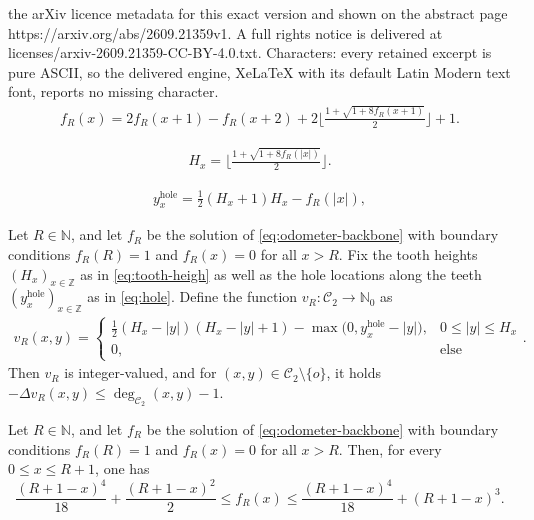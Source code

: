 \documentclass[10pt,a4paper]{amsart}
\newcommand{\N}{\mathbb{N}}
\newcommand{\Z}{\mathbb{Z}}
\begin{document}
the arXiv licence metadata for this exact version and shown on the abstract page https://arxiv.org/abs/2609.21359v1. A full rights notice is delivered at licenses/arxiv-2609.21359-CC-BY-4.0.txt. Characters: every retained excerpt is pure ASCII, so the delivered engine, XeLaTeX with its default Latin Modern text font, reports no missing character.
\begin{align}\label{eq:odometer-backbone}\tag{Rec-BB}
    f_R(x)   = 2f_R(x+1)-f_R(x+2) +2\Big\lfloor \frac{1+\sqrt{1+8f_R(x+1)}}{2}\Big\rfloor +1.
\end{align}

\begin{align}\label{eq:tooth-heigh}\tag{TH}
    H_x=\Big\lfloor \frac{1+\sqrt{1+8f_R(|x|)}}{2}\Big\rfloor.
\end{align}

\begin{align}\label{eq:hole}\tag{Hole}
y_x^{\text{hole}}=\frac{1}{2}(H_x+1)H_x-f_R(|x|),
\end{align}

\begin{lemma}\label{lem:outer-bound-stable}
Let $R\in\N$, and let $f_R$ be the solution of \eqref{eq:odometer-backbone} with boundary conditions $f_R(R)=1$ and $f_R(x)=0$ for all $x>R$. Fix the tooth heights $(H_x)_{x\in\Z}$ as in \eqref{eq:tooth-heigh} as well as the hole locations along the teeth $(y_x^{\text{hole}})_{x\in\Z}$ as in \eqref{eq:hole}. Define the function $v_R:\mathcal{C}_2\to\N_0$ as
\begin{align*}
    v_R(x,y)=\begin{cases}
        \frac{1}{2}(H_x-|y|)(H_x-|y|+1) -\max\bigl(0,y_x^{\mathrm{hole}}-|y|\bigr),&0\leq |y| \leq H_x\\
        0,&\text{else}
    \end{cases}.
\end{align*}
Then $v_R$ is integer-valued, and for   $(x,y)\in\mathcal{C}_2\setminus\{o\}$, it holds $-\Delta v_R(x,y)\leq \deg_{\mathcal{C}_2}(x,y)-1$.
\end{lemma}

\begin{lemma}\label{lem:outer-bound-asymptotics}
    Let $R\in\mathbb{N}$, and let $f_R$ be the solution of \eqref{eq:odometer-backbone} with boundary conditions $f_R(R)=1$ and $f_R(x)=0$ for all $x>R$. Then, for every $0\leq x\leq R+1$, one has
\[
    \frac{(R+1-x)^4}{18}+\frac{(R+1-x)^2}{2}\leq f_R(x)\leq\frac{(R+1-x)^4}{18}+(R+1-x)^3.
\]
\end{lemma}
\end{document}
